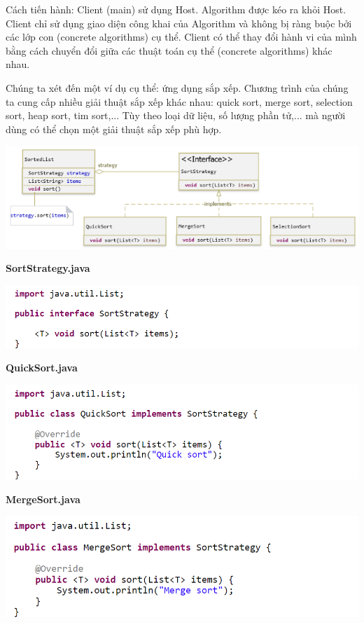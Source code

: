 Cách tiến hành: Client (main) sử dụng Host. Algorithm được kéo ra khỏi Host. Client chỉ sử dụng giao diện công khai của Algorithm và không bị ràng buộc bởi các lớp con (concrete algorithms) cụ thể. Client có thể thay đổi hành vi của mình bằng cách chuyển đổi giữa các thuật toán cụ thể (concrete algorithms) khác nhau.

Chúng ta xét đến một ví dụ cụ thể: ứng dụng sắp xếp.
Chương trình của chúng ta cung cấp nhiều giải thuật sắp xếp khác nhau: quick sort, merge sort, selection sort, heap sort, tim sort,... Tùy theo loại dữ liệu, số lượng phần tử,... mà người dùng có thể chọn một giải thuật sắp xếp phù hợp.
\begin{center}
\includegraphics{GALLEYS/images/chapter9/example}
\end{center}
\newpage
\textbf{SortStrategy.java}
\begin{center}
\includegraphics{GALLEYS/images/chapter9/code1}
\end{center}
\textbf{QuickSort.java}
\begin{center}
\includegraphics{GALLEYS/images/chapter9/code2}
\end{center}
\textbf{MergeSort.java}
\begin{center}
\includegraphics{GALLEYS/images/chapter9/code3}
\end{center}
